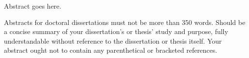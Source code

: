 Abstract goes here.

Abstracts for doctoral dissertations must not be more than 350 words.
Should be a concise summary of your dissertation’s or thesis’ study and purpose, fully understandable without reference to the
dissertation or thesis itself.
Your abstract ought not to contain any parenthetical or bracketed references.